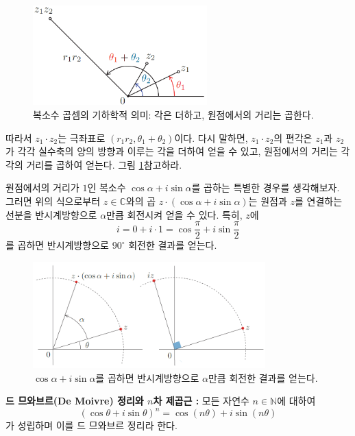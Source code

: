 \begin{figure}[!h]
\begin{center}
\includegraphics[width=0.6\textwidth]{./SaltChapter/figs/fig-1-5}
\end{center}
\caption{복소수 곱셈의 기하학적 의미: 각은 더하고, 원점에서의 거리는 곱한다.}
\label{fig-1-5}
\end{figure}

따라서 $z_1\cdot z_2$는 극좌표로 $(r_1r_2, \theta_1+\theta_2)$이다.
다시 말하면, 
$z_1\cdot z_2$의 편각은
$z_1$과 $z_2$가 각각 실수축의 양의 방향과 이루는 각을 더하여 얻을 수 있고,
원점에서의 거리는 각각의 거리를 곱하여 얻는다.
그림 \ref{fig-1-5}\를 참고하라.



원점에서의 거리가 $1$인 복소수
$\cos\alpha + i \sin\alpha$를 곱하는 특별한 경우를 생각해보자.
그러면 위의 식으로부터 $z\in\mathbb C$와의 곱
$z\cdot(\cos\alpha + i\sin\alpha)$는 
원점과 $z$를 연결하는 선분을 반시계방향으로 $\alpha$만큼 회전시켜 얻을 수 있다.
특히, $z$에 
$$
i = 0 + i\cdot 1 = \cos\frac\pi2 + i \sin\frac\pi2
$$
를 곱하면 반시계방향으로 $90^{\circ}$ 회전한 결과를 얻는다.

\begin{figure}[!h]
\begin{center}
\includegraphics[width=0.8\textwidth]{./SaltChapter/figs/fig-1-6}
\end{center}
\caption{$\cos\alpha + i \sin\alpha$를 곱하면 반시계방향으로 $\alpha$만큼 회전한 결과를 얻는다.}
\label{fig-1-6}
\end{figure}

{\bf 드 므와브르(De Moivre) 정리와 $n$차 제곱근 :}
모든 자연수 $n\in\mathbb N$에 대하여
$$
(\cos\theta + i\sin\theta)^n = \cos(n\theta) + i\sin(n\theta)
$$
가 성립하며 이를 드 므와브르 정리라 한다.

